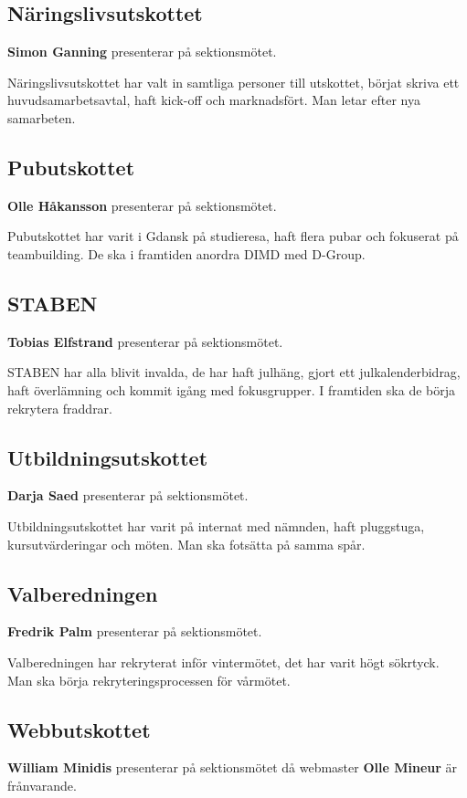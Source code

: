 \documentclass[../protokoll-vintermote-2024.tex]{subfiles}
\begin{document}
\subsection{Näringslivsutskottet}
\textbf{Simon Ganning} presenterar på sektionsmötet.

Näringslivsutskottet har valt in samtliga personer till utskottet, börjat skriva ett huvudsamarbetsavtal, haft kick-off och marknadsfört. Man letar efter nya samarbeten.

\subsection{Pubutskottet}
\textbf{Olle Håkansson} presenterar på sektionsmötet.

Pubutskottet har varit i Gdansk på studieresa, haft flera pubar och fokuserat på teambuilding. De ska i framtiden anordra DIMD med D-Group.

\subsection{STABEN}
\textbf{Tobias Elfstrand} presenterar på sektionsmötet.

STABEN har alla blivit invalda, de har haft julhäng, gjort ett julkalenderbidrag, haft överlämning och kommit igång med fokusgrupper. I framtiden ska de börja rekrytera fraddrar.

\subsection{Utbildningsutskottet}
\textbf{Darja Saed} presenterar på sektionsmötet. 

Utbildningsutskottet har varit på internat med nämnden, haft pluggstuga, kursutvärderingar och möten. Man ska fotsätta på samma spår.
 
\subsection{Valberedningen}
\textbf{Fredrik Palm} presenterar på sektionsmötet.

Valberedningen har rekryterat inför vintermötet, det har varit högt sökrtyck. Man ska börja rekryteringsprocessen för vårmötet.

\subsection{Webbutskottet}
\textbf{William Minidis} presenterar på sektionsmötet då webmaster \textbf{Olle Mineur} är frånvarande.
\end{document}
